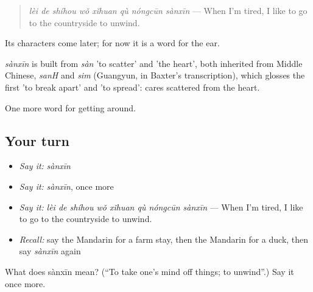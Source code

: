 \begin{quote}
\emph{lèi de shíhou wǒ xǐhuan qù nóngcūn sànxīn} — When I'm tired, I like to go to the countryside to unwind.
\end{quote}

Its characters come later; for now it is a word for the ear.

\begin{cousinweb}
\emph{sànxīn} is built from \emph{sàn} 'to scatter' and  'the heart', both inherited from Middle Chinese, \emph{sanH} and \emph{sim} (Guangyun, in Baxter's transcription), which glosses the first 'to break apart' and 'to spread': cares scattered from the heart.
\end{cousinweb}

\begin{grammarlens}[title={What you've built}]
One more word for getting around.
\end{grammarlens}

\subsection*{Your turn}
\begin{itemize}
\raggedright
  \item \emph{Say it:} \emph{sànxīn}
  \item \emph{Say it:} \emph{sànxīn}, once more
  \item \emph{Say it:} \emph{lèi de shíhou wǒ xǐhuan qù nóngcūn sànxīn} — When I'm tired, I like to go to the countryside to unwind.
  \item \emph{Recall:} say the Mandarin for a farm stay, then the Mandarin for a duck, then say \emph{sànxīn} again
\end{itemize}

\begin{tcolorbox}[breakable,colback=teal!4,colframe=teal!35!black,title={Before you move on}]
What does sànxīn mean? (\textquotedblleft{}To take one's mind off things; to unwind\textquotedblright{}.) Say it once more.
\end{tcolorbox}
